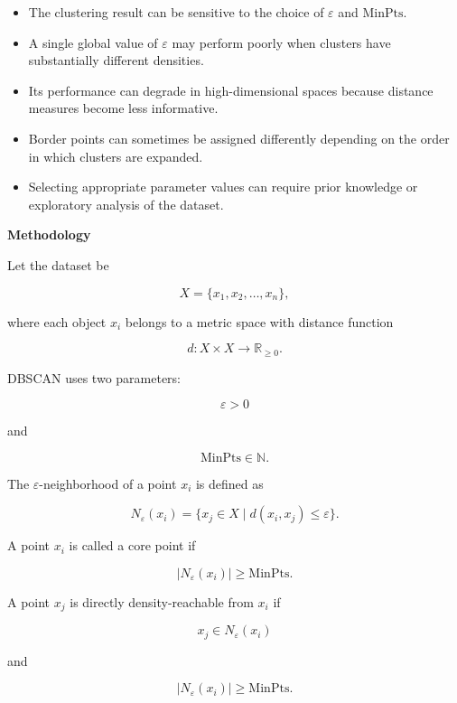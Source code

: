 \documentclass{book}
\providecommand{\ProjectDeepHeading}[2]{%
    \par\medskip\noindent\textbf{#2}\par\smallskip
}
\begin{document}
         \begin{itemize}
            \item The clustering result can be sensitive to the choice of $\ensuremath{\varepsilon}$ and $\mathrm{MinPts}$.
            \item A single global value of $\ensuremath{\varepsilon}$ may perform poorly when clusters have substantially different densities.
            \item Its performance can degrade in high-dimensional spaces because distance measures become less informative.
            \item Border points can sometimes be assigned differently depending on the order in which clusters are expanded.
            \item Selecting appropriate parameter values can require prior knowledge or exploratory analysis of the dataset.
         \end{itemize}
   \ProjectDeepHeading{3}{Methodology}

      Let the dataset be

      \[
      X = \{x_1, x_2, \dots, x_n\},
      \]

      where each object \(x_i\) belongs to a metric space with distance function

      \[
      d : X \times X \rightarrow \mathbb{R}_{\geq 0}.
      \]

      DBSCAN uses two parameters:

      \[
      \ensuremath{\varepsilon} > 0
      \]

      and

      \[
      \mathrm{MinPts} \in \mathbb{N}.
      \]

      The \(\ensuremath{\varepsilon}\)-neighborhood of a point \(x_i\) is defined as

      \[
      N_{\ensuremath{\varepsilon}}(x_i)
      =
      \{x_j \in X \mid d(x_i, x_j) \leq \ensuremath{\varepsilon}\}.
      \]

      A point \(x_i\) is called a core point if

      \[
      |N_{\ensuremath{\varepsilon}}(x_i)| \geq \mathrm{MinPts}.
      \]

      A point \(x_j\) is directly density-reachable from \(x_i\) if

      \[
      x_j \in N_{\ensuremath{\varepsilon}}(x_i)
      \]

      and

      \[
      |N_{\ensuremath{\varepsilon}}(x_i)| \geq \mathrm{MinPts}.
      \]
\end{document}
